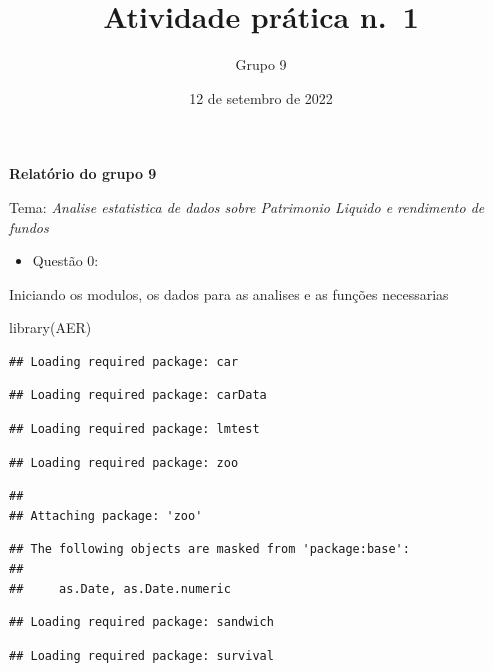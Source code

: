 \documentclass[
]{article}
\title{Atividade prática n.~1}
\author{Grupo 9}
\date{12 de setembro de 2022}
\newenvironment{Shaded}{\begin{snugshade}}{\end{snugshade}}
\newcommand{\FunctionTok}[1]{\textcolor[rgb]{0.00,0.00,0.00}{#1}}
\newcommand{\NormalTok}[1]{#1}
\providecommand{\tightlist}{%
  \setlength{\itemsep}{0pt}\setlength{\parskip}{0pt}}
\begin{document}
\maketitle

\textbf{Relatório do grupo 9}

Tema: \emph{Analise estatistica de dados sobre Patrimonio Liquido e
rendimento de fundos}

\begin{itemize}
\tightlist
\item
  Questão 0:
\end{itemize}

Iniciando os modulos, os dados para as analises e as funções necessarias

\begin{Shaded}
\begin{Highlighting}[]
\FunctionTok{library}\NormalTok{(AER)}
\end{Highlighting}
\end{Shaded}

\begin{verbatim}
## Loading required package: car
\end{verbatim}

\begin{verbatim}
## Loading required package: carData
\end{verbatim}

\begin{verbatim}
## Loading required package: lmtest
\end{verbatim}

\begin{verbatim}
## Loading required package: zoo
\end{verbatim}

\begin{verbatim}
## 
## Attaching package: 'zoo'
\end{verbatim}

\begin{verbatim}
## The following objects are masked from 'package:base':
## 
##     as.Date, as.Date.numeric
\end{verbatim}

\begin{verbatim}
## Loading required package: sandwich
\end{verbatim}

\begin{verbatim}
## Loading required package: survival
\end{verbatim}
\end{document}
